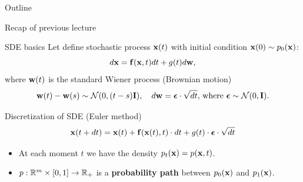 

\usepackage{tikz}

\usetikzlibrary{arrows,shapes,positioning,shadows,trees}

\begin{frame}
\titlepage
\end{frame}
\begin{frame}{Outline}
	\tableofcontents
\end{frame}
\begin{frame}{Recap of previous lecture}
	\vspace{-0.2cm}
	\begin{block}{SDE basics}
		Let define stochastic process $\mathbf{x}(t)$ with initial condition $\mathbf{x}(0) \sim p_0(\mathbf{x})$:
		\[
			d\mathbf{x} = \mathbf{f}(\mathbf{x}, t) dt + g(t) d \mathbf{w}, 
		\]
		where $\mathbf{w}(t)$ is the standard Wiener process (Brownian motion)
		\vspace{-0.2cm}
		\[		
			\mathbf{w}(t) - \mathbf{w}(s) \sim \mathcal{N}(0, (t - s) \mathbf{I}), \quad d \mathbf{w} = \boldsymbol{\epsilon} \cdot \sqrt{dt}, \, \text{where } \boldsymbol{\epsilon} \sim \mathcal{N}(0, \mathbf{I}).
		\]
	\end{block}
	\vspace{-0.3cm}
	\begin{block}{Discretization of SDE (Euler method)}
		\vspace{-0.3cm}
		\[
			\mathbf{x}(t + dt) = \mathbf{x}(t) + \mathbf{f}(\mathbf{x}(t), t) \cdot dt + g(t) \cdot \boldsymbol{\epsilon} \cdot \sqrt{dt}
		\]
		\vspace{-0.3cm}
	\end{block}
	\begin{itemize}
		\item At each moment $t$ we have the density $p_t(\mathbf{x}) = p(\mathbf{x}, t)$.
		\item $p: \mathbb{R}^m \times [0, 1] \rightarrow \mathbb{R}_+$ is a \textbf{probability path} between $p_0(\mathbf{x})$ and $p_1(\mathbf{x})$.
	\end{itemize}
\end{frame}
